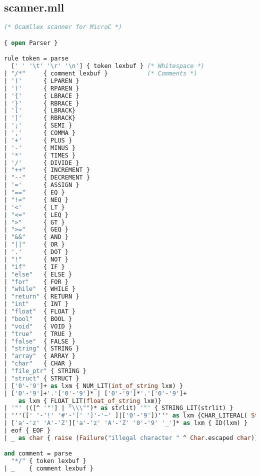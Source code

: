 \documentclass{article}
\begin{document}
\subsection{scanner.mll}
\begin{lstlisting}[language=Caml]
(* Ocamllex scanner for MicroC *)

{ open Parser }

rule token = parse
  [' ' '\t' '\r' '\n'] { token lexbuf } (* Whitespace *)
| "/*"     { comment lexbuf }           (* Comments *)
| '('      { LPAREN }
| ')'      { RPAREN }
| '{'      { LBRACE }
| '}'      { RBRACE }
| '['      { LBRACK}
| ']'      { RBRACK}
| ';'      { SEMI }
| ','      { COMMA }
| '+'      { PLUS }
| '-'      { MINUS }
| '*'      { TIMES }
| '/'      { DIVIDE }
| "++"     { INCREMENT }
| "--"     { DECREMENT }
| '='      { ASSIGN }
| "=="     { EQ }
| "!="     { NEQ }
| '<'      { LT }
| "<="     { LEQ }
| ">"      { GT }
| ">="     { GEQ }
| "&&"     { AND }
| "||"     { OR }
| '.'      { DOT }
| "!"      { NOT }
| "if"     { IF }
| "else"   { ELSE }
| "for"    { FOR }
| "while"  { WHILE }
| "return" { RETURN }
| "int"    { INT }
| "float"  { FLOAT }
| "bool"   { BOOL }
| "void"   { VOID }
| "true"   { TRUE }
| "false"  { FALSE }
| "string" { STRING }
| "array"  { ARRAY }
| "char"   { CHAR }
| "file_ptr" { STRING }
| "struct" { STRUCT }
| ['0'-'9']+ as lxm { NUM_LIT(int_of_string lxm) }
| ['0'-'9']+'.'['0'-'9']* | ['0'-'9']*'.'['0'-'9']+ 
	as lxm { FLOAT_LIT(float_of_string lxm)}
| '"' (([^ '"'] | "\\\"")* as strlit) '"' { STRING_LIT(strlit) } 
| '''([' '-'!' '#'-'[' ']'-'~' ]|['0'-'9'])''' as lxm {CHAR_LITERAL( String.get lxm 1)}
| ['a'-'z' 'A'-'Z']['a'-'z' 'A'-'Z' '0'-'9' '_']* as lxm { ID(lxm) }
| eof { EOF }
| _ as char { raise (Failure("illegal character " ^ Char.escaped char)) }

and comment = parse
  "*/" { token lexbuf }
| _    { comment lexbuf }
\end{lstlisting}
\end{document}

